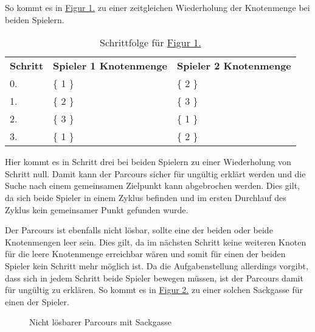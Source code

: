 \documentclass[a4paper,10pt,ngerman]{scrartcl}
\begin{document}
    So kommt es in \hyperref[fig:Figure1]{Figur 1.}
    zu einer zeitgleichen Wiederholung der Knotenmenge bei beiden Spielern.

    \begin{table}
        \centering
        \begin{tabular}{lll}
            \textbf{Schritt} & \textbf{Spieler 1 Knotenmenge} & \textbf{Spieler 2 Knotenmenge} \\
            0.               & \{ 1 \}                        & \{ 2 \}                        \\
            1.               & \{ 2 \}                        & \{ 3 \}                        \\
            2.               & \{ 3 \}                        & \{ 1 \}                        \\
            3.               & \{ 1 \}                        & \{ 2 \}                        \\
        \end{tabular}
        \caption{Schrittfolge für \hyperref[fig:Figure1]{Figur 1.}}
        \label{tab:Table1}
    \end{table}

    Hier kommt es in Schritt drei bei beiden Spielern zu einer Wiederholung von Schritt null.
    Damit kann der Parcours sicher für ungültig erklärt werden
    und die Suche nach einem gemeinsamen Zielpunkt kann abgebrochen werden.
    Dies gilt, da sich beide Spieler in einem Zyklus befinden
    und im ersten Durchlauf des Zyklus kein gemeinsamer Punkt gefunden wurde.

    Der Parcours ist ebenfalls nicht lösbar, sollte eine der beiden oder beide Knotenmengen leer sein.
    Dies gilt, da im nächsten Schritt keine weiteren Knoten für die leere Knotenmenge erreichbar wären
    und somit für einen der beiden Spieler kein Schritt mehr möglich ist.
    Da die Aufgabenstellung allerdings vorgibt, dass sich in jedem Schritt beide Spieler bewegen müssen,
    ist der Parcours damit für ungültig zu erklären.
    So kommt es in \hyperref[fig:Figure2]{Figur 2.} zu einer solchen Sackgasse für einen der Spieler.

    \begin{figure}[!h]
        \centering
        \FigurZwei{}
        \caption{Nicht lösbarer Parcours mit Sackgasse}
        \label{fig:Figure2}
    \end{figure}
\end{document}
